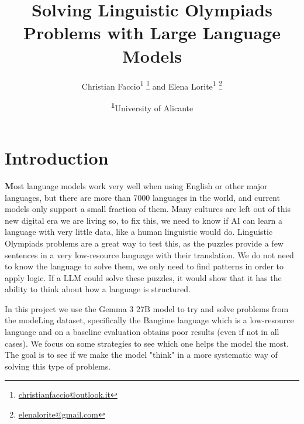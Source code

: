 \documentclass[
	a4paper, %
	10pt, %
	unnumberedsections, %
	twoside, %
]{LTJournalArticle}
\title{Solving Linguistic Olympiads Problems with Large Language Models} %
\author{%
	Christian Faccio\textsuperscript{1} \thanks{\href{mailto:christianfaccio@outlook.it}{christianfaccio@outlook.it}} and Elena Lorite\textsuperscript{1} \thanks{\href{mailto:elenalorite@gmail.com}{elenalorite@gmail.com}}
}
\date{\footnotesize\textsuperscript{\textbf{1}}University of Alicante}
\begin{document}
\maketitle %


\section{Introduction}
\lettrine[findent=2pt]{\textbf{M}}{}ost language models work very well when using English or other major languages, but there are more than 7000 languages in the world, and current models only support a small fraction of them. Many cultures are left out of this new digital era we are living so, to fix this, we need to know if AI can learn a language with very little data, like a human linguistic would do. 
Linguistic Olympiads problems are a great way to test this, as the puzzles provide a few sentences in a very low-resource language with their translation. We do not need to know the language to solve them, we only need to find patterns in order to apply logic. If a LLM could solve these puzzles, it would show that it has the ability to think about how a language is structured.

In this project we use the Gemma 3 27B model to try and solve problems from the modeLing dataset, specifically the Bangime language which is a low-resource language and on a baseline evaluation obtains poor results (even if not in all cases). We focus on some strategies to see which one helps the model the most. The goal is to see if we make the model "think" in a more systematic way of solving this type of problems.
\end{document}
